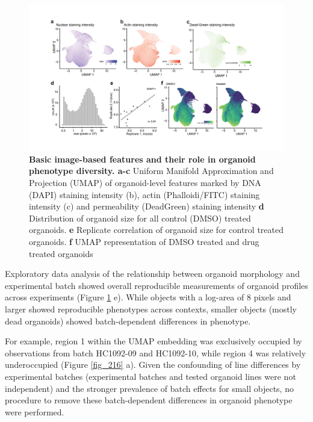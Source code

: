 \begin{flushleft}
\begin{figure}[h]
\centering
\includegraphics[width=\textwidth,
                height=\textheight,
                keepaspectratio]{figures/promise/pdf/fig_1_5.pdf}
\caption{\textbf{Basic image-based features and their role in organoid phenotype diversity. a-c} Uniform Manifold Approximation and Projection (UMAP) of organoid-level features marked by DNA (DAPI) staining intensity (b), actin (Phalloidi/FITC) staining intensity (c) and permeability (DeadGreen) staining intensity \textbf{d} Distribution of organoid size for all control (DMSO) treated organoids. \textbf{e} Replicate correlation of organoid size for control treated organoids. \textbf{f} UMAP representation of DMSO treated and drug treated organoids}
\label{fig_145}
\end{figure}
\bigbreak

Exploratory data analysis of the relationship between organoid morphology and experimental batch showed overall reproducible measurements of organoid profiles across experiments (Figure \ref{fig_145} e). While objects with a log-area of 8 pixels and larger showed reproducible phenotypes across contexts, smaller objects (mostly dead organoids) showed batch-dependent differences in phenotype.

\smallbreak
For example, region 1 within the UMAP embedding was exclusively occupied by observations from batch HC1092-09 and HC1092-10, while region 4 was relatively underoccupied (Figure \ref{fig_216} a). Given the confounding of line differences by experimental batches (experimental batches and tested organoid lines were not independent) and the stronger prevalence of batch effects for small objects, no procedure to remove these batch-dependent differences in organoid phenotype were performed. 

\bigbreak


\end{flushleft}
